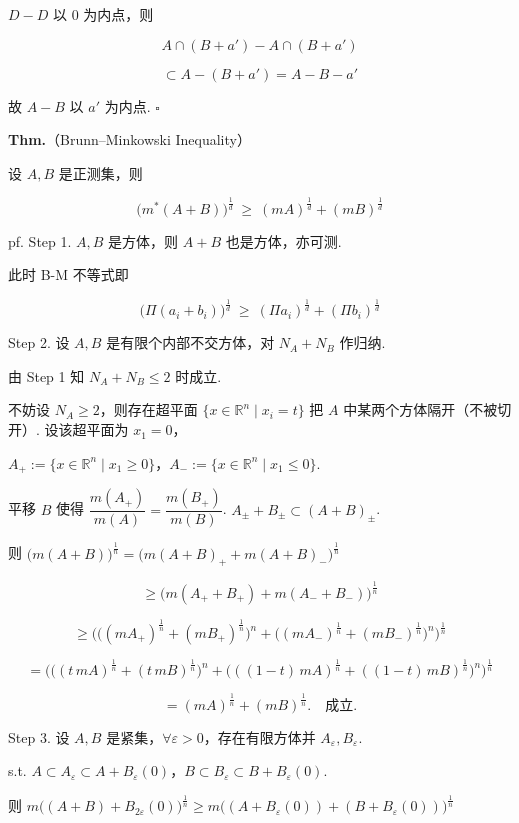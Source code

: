 \documentclass[11pt]{ctexart}
\theoremstyle{definition}
\begin{document}
$D - D$ 以 0 为内点，则

\[
A \cap (B + a') - A \cap (B + a')
\]

\[
\subset A - (B + a') = A - B - a'
\]

故 $A - B$ 以 $a'$ 为内点. $\square$

\textbf{Thm.}（Brunn–Minkowski Inequality）

设 $A, B$ 是正测集，则

\[
\big(m^*(A+B)\big)^{\frac{1}{d}} \ \geq\ (mA)^{\frac{1}{d}} + (mB)^{\frac{1}{d}}
\]

pf. Step 1. $A, B$ 是方体，则 $A + B$ 也是方体，亦可测.

此时 B-M 不等式即

\[
\big(\Pi (a_i + b_i)\big)^{\frac{1}{d}} \ \geq\ (\Pi a_i)^{\frac{1}{d}} + (\Pi b_i)^{\frac{1}{d}}
\]

Step 2. 设 $A, B$ 是有限个内部不交方体，对 $N_A + N_B$ 作归纳.

由 Step 1 知 $N_A + N_B \leq 2$ 时成立.

不妨设 $N_A \geq 2$，则存在超平面 $\{x \in \mathbb{R}^n \mid x_i = t\}$ 把 $A$ 中某两个方体隔开（不被切开）. 设该超平面为 $x_1 = 0$，

$A_+ := \{x \in \mathbb{R}^n \mid x_1 \geq 0\}$，$A_- := \{x \in \mathbb{R}^n \mid x_1 \leq 0\}$.

平移 $B$ 使得 $\dfrac{m(A_+)}{m(A)} = \dfrac{m(B_+)}{m(B)}$. $A_\pm + B_\pm \subset (A + B)_\pm$.

则 $\big(m(A+B)\big)^{\frac{1}{n}} = \big(m(A+B)_+ + m(A+B)_-\big)^{\frac{1}{n}}$

\[
\geq \big(m(A_+ + B_+) + m(A_- + B_-)\big)^{\frac{1}{n}}
\]

\[
\geq \Big(\big((mA_+)^{\frac{1}{n}} + (mB_+)^{\frac{1}{n}}\big)^{n} + \big((mA_-)^{\frac{1}{n}} + (mB_-)^{\frac{1}{n}}\big)^{n}\Big)^{\frac{1}{n}}
\]

\[
= \Big(\big((t\, mA)^{\frac{1}{n}} + (t\, mB)^{\frac{1}{n}}\big)^{n} + \big(((1-t)\, mA)^{\frac{1}{n}} + ((1-t)\, mB)^{\frac{1}{n}}\big)^{n}\Big)^{\frac{1}{n}}
\]

\[
= (mA)^{\frac{1}{n}} + (mB)^{\frac{1}{n}}. \quad \text{成立.}
\]

Step 3. 设 $A, B$ 是紧集，$\forall \varepsilon > 0$，存在有限方体并 $A_\varepsilon, B_\varepsilon$.

s.t. $A \subset A_\varepsilon \subset A + B_\varepsilon(0)$，$B \subset B_\varepsilon \subset B + B_\varepsilon(0)$.

则 $m\big((A+B) + B_{2\varepsilon}(0)\big)^{\frac{1}{n}} \geq m\big((A + B_\varepsilon(0)) + (B + B_\varepsilon(0))\big)^{\frac{1}{n}}$
\end{document}
